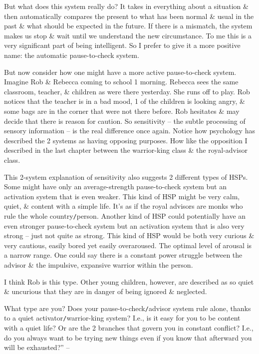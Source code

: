 \documentclass{article}
\numberwithin{equation}{section}
\begin{document}
But what does this system really do? It takes in everything about a situation \& then automatically compares the present to what has been normal \& usual in the past \& what should be expected in the future. If there is a mismatch, the system makes us stop \& wait until we understand the new circumstance. To me this is a very significant part of being intelligent. So I prefer to give it a more positive name: the automatic pause-to-check system.

But now consider how one might have a more active pause-to-check system. Imagine Rob \& Rebecca coming to school 1 morning. Rebecca sees the same classroom, teacher, \& children as were there yesterday. She runs off to play. Rob notices that the teacher is in a bad mood, 1 of the children is looking angry, \& some bags are in the corner that were not there before. Rob hesitates \& may decide that there is reason for caution. So sensitivity -- the subtle processing of sensory information -- is the real difference once again. Notice how psychology has described the 2 systems as having opposing purposes. How like the opposition I described in the last chapter between the warrior-king class \& the royal-advisor class.

This 2-system explanation of sensitivity also suggests 2 different types of HSPs. Some might have only an average-strength pause-to-check system but an activation system that is even weaker. This kind of HSP might be very calm, quiet, \& content with a simple life. It's as if the royal advisors are monks who rule the whole country{\tt/}person. Another kind of HSP could potentially have an even stronger pause-to-check system but an activation system that is also very strong -- just not quite as strong. This kind of HSP would be both very curious \& very cautious, easily bored yet easily overaroused. The optimal level of arousal is a narrow range. One could say there is a constant power struggle between the advisor \& the impulsive, expansive warrior within the person.

I think Rob is this type. Other young children, however, are described as so quiet \& uncurious that they are in danger of being ignored \& neglected.

What type are you? Does your pause-to-check{\tt/}advisor system rule alone, thanks to a quiet activator{\tt/}warrior-king system? I.e., is it easy for you to be content with a quiet life? Or are the 2 branches that govern you in constant conflict? I.e., do you always want to be trying new things even if you know that afterward you will be exhausted?'' -- \cite[pp. 63--65]{Aron2013}
\end{document}
